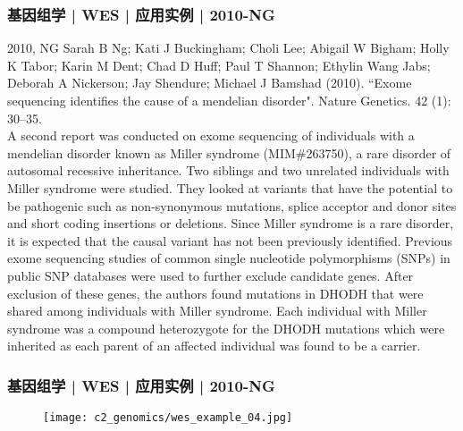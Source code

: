 \begin{frame}
  \frametitle{基因组学 | WES | 应用实例 | 2010-NG}
  \footnotesize{
    \begin{block}{2010, NG}
  Sarah B Ng; Kati J Buckingham; Choli Lee; Abigail W Bigham; Holly K Tabor; Karin M Dent; Chad D Huff; Paul T Shannon; Ethylin Wang Jabs; Deborah A Nickerson; Jay Shendure; Michael J Bamshad (2010). ``Exome sequencing identifies the cause of a mendelian disorder". Nature Genetics. 42 (1): 30–35.\\
  \vspace{1em}
  A second report was conducted on exome sequencing of individuals with a mendelian disorder known as Miller syndrome (MIM\#263750), a rare disorder of autosomal recessive inheritance. Two siblings and two unrelated individuals with Miller syndrome were studied. They looked at variants that have the potential to be pathogenic such as non-synonymous mutations, splice acceptor and donor sites and short coding insertions or deletions. Since Miller syndrome is a rare disorder, it is expected that the causal variant has not been previously identified. Previous exome sequencing studies of common single nucleotide polymorphisms (SNPs) in public SNP databases were used to further exclude candidate genes. After exclusion of these genes, the authors found mutations in DHODH that were shared among individuals with Miller syndrome. Each individual with Miller syndrome was a compound heterozygote for the DHODH mutations which were inherited as each parent of an affected individual was found to be a carrier.
    \end{block}
}
\end{frame}

\begin{frame}
  \frametitle{基因组学 | WES | 应用实例 | 2010-NG}
  \begin{figure}
    \centering
    \texttt{[image: c2\_genomics/wes\_example\_04.jpg]}
  \end{figure}
\end{frame}

